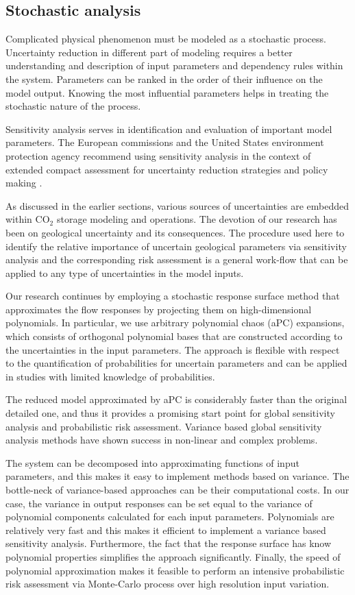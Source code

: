 \subsection{Stochastic analysis}

Complicated physical phenomenon must be modeled as a stochastic process.
Uncertainty reduction in different part of modeling requires a better
understanding and description of input parameters and dependency rules within
the system. Parameters can be ranked in the order of their influence on the
model output. Knowing the most influential parameters helps in treating the
stochastic nature of the process.

Sensitivity analysis serves in identification and evaluation of important model
parameters. The European commissions and the United States environment
protection agency recommend using sensitivity analysis in the context of
extended compact assessment for uncertainty reduction strategies and policy
making \cite{saltelli4global}.

As discussed in the earlier sections, various sources of uncertainties are
embedded within $\mbox{CO}_{2}$ storage modeling and operations. The devotion of
our research has been on geological uncertainty and its consequences. The
procedure used here to identify the relative importance of uncertain geological
parameters via sensitivity analysis and the corresponding risk assessment is a
general work-flow that can be applied to any type of uncertainties in the model
inputs.

Our research continues by employing a stochastic response surface method that
approximates the flow responses by projecting them on high-dimensional
polynomials. In particular, we use arbitrary polynomial chaos (aPC) expansions,
which consists of orthogonal polynomial bases that are constructed  according
to the uncertainties in the input parameters. The approach is flexible with
respect to the quantification of probabilities for uncertain parameters and can
be applied in studies with limited knowledge of probabilities. 

The reduced model approximated by aPC is considerably faster than the original
detailed one, and thus it  provides a promising start point for global
sensitivity analysis and probabilistic risk assessment. Variance based global
sensitivity analysis methods have shown success in non-linear and complex
problems\cite{reuter2008global}.

The system can be decomposed into approximating functions of input parameters,
and this makes it easy to implement methods based on variance. The bottle-neck
of variance-based approaches can be their computational costs. In our case, the
variance in output responses can be set equal to the variance of polynomial
components calculated for each input parameters. Polynomials are relatively
very fast and this makes it efficient to implement a variance based sensitivity
analysis. Furthermore, the fact that the response surface has know polynomial
properties simplifies the approach significantly.
Finally, the speed of polynomial approximation makes it feasible to perform an
intensive probabilistic risk assessment via Monte-Carlo process over high
resolution input variation.

